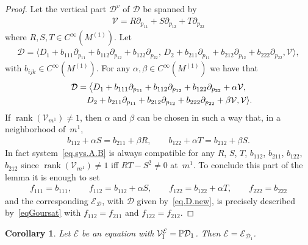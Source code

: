 \documentclass[10pt,a4paper]{amsart}
\newcommand{\D}{\mathcal{D}}
\newcommand{\MM}{\mathcal{V}_{\textrm{\normalfont I}}}
\newcommand{\E}{\mathcal{E}}
\renewcommand{\P}{\mathbb{P}}
\newcommand{\rank}{\operatorname{rank}}
\numberwithin{equation}{section}
\newtheorem{Corollary}[Theorem]{Corollary}
\begin{document}
\begin{proof}
Let the vertical part $\mathcal{D}^v$ of $\mathcal{D}$ be spanned by
\begin{gather*}
\mathcal{V}=R\partial_{p_{11}}+S\partial_{p_{12}}+T\partial_{p_{22}}
\end{gather*}
where $R,S,T\in C^\infty(M^{(1)})$. Let
\begin{gather*}
\mathcal{D}=
\langle D_1 + b_{111}\partial_{p_{11}} + b_{112}\partial_{p_{12}} + b_{122}\partial_{p_{22}},\,
D_2 + b_{211}\partial_{p_{11}} + b_{212}\partial_{p_{12}} + b_{222}\partial_{p_{22}},
\mathcal{V} \rangle,
\end{gather*}
with $b_{ijk}\in C^\infty(M^{(1)})$. For any $\alpha,\beta\in C^\infty(M^{(1)})$ we have that
\begin{gather}
\D =\big\langle D_1 + b_{111}\partial_{p_{11}} + b_{112}\partial_{p_{12}} + b_{122}\partial_{p_{22}}
+ \alpha \mathcal{V},\nonumber\\
\hphantom{\D =\big\langle}{}
D_2 + b_{211}\partial_{p_{11}} + b_{212}\partial_{p_{12}} + b_{222}\partial_{p_{22}}
+ \beta \mathcal{V} ,
\mathcal{V} \rangle.\label{eq.D.new}
\end{gather}
If $\rank(\mathcal{V}_{m^1})\neq 1$, then $\alpha$ and $\beta$ can be chosen in such a way that, in a neighborhood of~$m^1$,
\begin{gather}\label{eq.sys.A.B}
b_{112}+\alpha S=b_{211}+\beta R , \qquad b_{122}+\alpha T=b_{212}+\beta S.
\end{gather}
In fact system~\eqref{eq.sys.A.B} is always compatible for any
$R$, $S$, $T$, $b_{112}$, $b_{211}$, $b_{122}$, $b_{212}$ since \mbox{$\rank(\mathcal{V}_{m^1}){\neq} 1$} if\/f $RT-S^2\neq 0$ at~$m^1$. To conclude this part of the lemma it is enough to set
\begin{gather*}
f_{111}=b_{111} , \qquad f_{112}=b_{112}+\alpha S, \qquad f_{122}=b_{122}+\alpha T, \qquad f_{222}=b_{222}
\end{gather*}
and the corresponding $\E_{\D}$, with $\D$ given by~\eqref{eq.D.new}, is precisely described by~\eqref{eqGoursat} with $f_{112}=f_{211}$ and $f_{122}=f_{212}$.
\end{proof}

\begin{Corollary}\label{CorollarioCheSeFunzionaSarebbeCarino}
 Let $\E$ be an equation with $\MM^\E=\P\D_1$. Then $\E=\E_{\D_1}$.
\end{Corollary}
\end{document}
